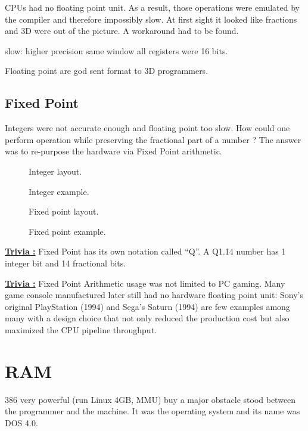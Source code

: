 \documentclass[book.tex]{subfiles}
\begin{document}
  CPUs had no floating point unit.
   \bigskip
   As a result, those operations were emulated by the compiler and therefore impossibly slow. At first sight it looked like fractions and 3D were out of the picture. A workaround had to be found.


    slow: higher precision
          same window
          all registers were 16 bits.
\bigskip


  
     Floating point are god sent format to 3D programmers.

  \subsection{Fixed Point}
  Integers were not accurate enough and floating point too slow. How could one perform operation while preserving the fractional part of a number ? The answer was to re-purpose the hardware via Fixed Point arithmetic.
\begin{figure}[H]
\centering
 
 \caption{Integer layout.} \label{fig:mips}
 \end{figure}

\begin{figure}[H]
\centering

 \caption{Integer example.} \label{fig:mips}
 \end{figure}

\begin{figure}[H]
 \centering
  
 \caption{Fixed point layout.} \label{fig:mips}
\end{figure}

\begin{figure}[H]
 \centering
   
  \caption{Fixed point example.} \label{fig:mips}
\end{figure} 

 \textbf{\underline{Trivia :}} Fixed Point has its own notation called “Q”. A Q1.14 number has 1 integer bit and 14 fractional bits.

\bigskip

 \textbf{\underline{Trivia :}}  Fixed Point Arithmetic usage was not limited to PC gaming. Many game console manufactured later still had no hardware floating point unit: Sony's original PlayStation (1994) and Sega's Saturn (1994) are few examples among many with a design choice that not only reduced the production cost but also maximized the CPU pipeline throughput. 

\bigskip

\section{RAM}
  386 very powerful (run Linux 4GB, MMU) buy a major obstacle stood between the programmer and the machine. It was the operating system and its name was DOS 4.0.
  \bigskip
\end{document}
